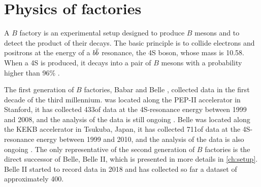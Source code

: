 \clearpage
\section[Physics of $B$ factories]{Physics of {\boldmath\B} factories} \label{sec:b_factories}

A $B$ factory is an experimental setup designed to produce $B$ mesons and to detect the product of their decays.
The basic principle is to collide electrons and positrons at the energy of a $b\overline b$ resonance, the \Y4S boson, whose mass is 10.58\gevcc.
When a \Y4S is produced, it decays into a pair of $B$ mesons with a probability higher than 96\% \cite{ParticleDataGroup:2020ssz} .

The first generation of $B$ factories, Babar \cite{BaBar:2001yhh, BaBar:2013byz} and Belle \cite{Belle:2000cnh, Belle:2012iwr}, collected data in the first decade of the third millennium.
\babar was located along the PEP-II accelerator in Stanford, it has collected 433\invfb of data at the \Y4S-resonance energy between 1999 and 2008, and the analysis of the data is still ongoing \cite{BaBar:2014omp}.
Belle was located along the KEKB accelerator in Tsukuba, Japan, it has collected 711\invfb of data at the \Y4S-resonance energy between 1999 and 2010, and the analysis of the data is also ongoing \cite{BaBar:2014omp}.
The only representative of the second generation of $B$ factories is the direct successor of Belle, Belle II, which is presented in more details in \cref{ch:setup}.
Belle II started to record data in 2018 and has collected so far a dataset of approximately 400\invfb.


